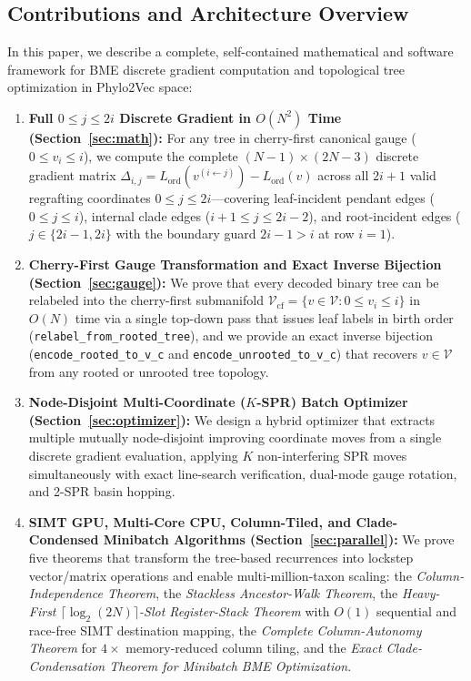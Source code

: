 \documentclass[11pt,a4paper]{article}
\theoremstyle{definition}
\begin{document}
\subsection{Contributions and Architecture Overview}
In this paper, we describe a complete, self-contained mathematical and software framework for BME discrete gradient computation and topological tree optimization in Phylo2Vec space:
\begin{enumerate}
    \item \textbf{Full $0 \le j \le 2i$ Discrete Gradient in $O(N^2)$ Time (Section~\ref{sec:math}):} For any tree in cherry-first canonical gauge ($0 \le v_i \le i$), we compute the complete $(N-1) \times (2N-3)$ discrete gradient matrix $\Delta_{i,j} = L_{\text{ord}}(v^{(i \leftarrow j)}) - L_{\text{ord}}(v)$ across all $2i+1$ valid regrafting coordinates $0 \le j \le 2i$—covering leaf-incident pendant edges ($0 \le j \le i$), internal clade edges ($i+1 \le j \le 2i-2$), and root-incident edges ($j \in \{2i-1, 2i\}$ with the boundary guard $2i-1 > i$ at row $i=1$).
    \item \textbf{Cherry-First Gauge Transformation and Exact Inverse Bijection (Section~\ref{sec:gauge}):} We prove that every decoded binary tree can be relabeled into the cherry-first submanifold $\mathcal{V}_{\text{cf}} = \{v \in \mathcal{V} : 0 \le v_i \le i\}$ in $O(N)$ time via a single top-down pass that issues leaf labels in birth order (\texttt{relabel\_from\_rooted\_tree}), and we provide an exact inverse bijection (\texttt{encode\_rooted\_to\_v\_c} and \texttt{encode\_unrooted\_to\_v\_c}) that recovers $v \in \mathcal{V}$ from any rooted or unrooted tree topology.
    \item \textbf{Node-Disjoint Multi-Coordinate ($K$-SPR) Batch Optimizer (Section~\ref{sec:optimizer}):} We design a hybrid optimizer that extracts multiple mutually node-disjoint improving coordinate moves from a single discrete gradient evaluation, applying $K$ non-interfering SPR moves simultaneously with exact line-search verification, dual-mode gauge rotation, and 2-SPR basin hopping.
    \item \textbf{SIMT GPU, Multi-Core CPU, Column-Tiled, and Clade-Condensed Minibatch Algorithms (Section~\ref{sec:parallel}):} We prove five theorems that transform the tree-based recurrences into lockstep vector/matrix operations and enable multi-million-taxon scaling: the \emph{Column-Independence Theorem}, the \emph{Stackless Ancestor-Walk Theorem}, the \emph{Heavy-First $\lceil \log_2(2N) \rceil$-Slot Register-Stack Theorem} with $O(1)$ sequential and race-free SIMT destination mapping, the \emph{Complete Column-Autonomy Theorem} for $4\times$ memory-reduced column tiling, and the \emph{Exact Clade-Condensation Theorem for Minibatch BME Optimization}.
\end{enumerate}
\end{document}
